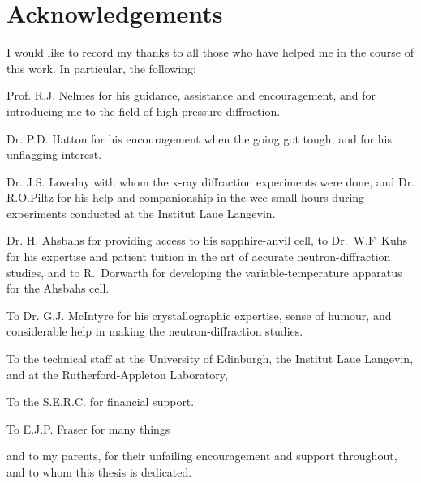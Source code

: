 \chapter*{Acknowledgements}

\noindent

\normalsize

I would like to record my thanks to all those who have helped me in the
course of this work. In particular, the following:

Prof. R.J. Nelmes for his guidance, assistance and encouragement, and for
introducing me to the field of high-pressure diffraction.

Dr. P.D. Hatton for his encouragement when the going got tough, and for his
unflagging interest.

Dr. J.S. Loveday with whom the x-ray diffraction experiments were done, and
Dr. R.O.Piltz for his help and companionship in the wee small hours during
experiments conducted at the Institut Laue Langevin.

Dr. H. Ahsbahs for providing access to his sapphire-anvil cell, to
Dr.~W.F~Kuhs for his expertise and patient tuition in the art of accurate
neutron-diffraction studies, and to R.~Dorwarth for developing the
variable-temperature apparatus for the Ahsbahs cell.

To Dr. G.J. McIntyre for his crystallographic expertise, sense of humour, and
considerable help in making the neutron-diffraction studies.

To the technical staff at the University of Edinburgh, the Institut
Laue Langevin, and at the Rutherford-Appleton Laboratory,

To the S.E.R.C. for financial support.

To E.J.P. Fraser for many things

and to my parents, for their unfailing encouragement and support throughout, and
to whom this thesis is dedicated.


